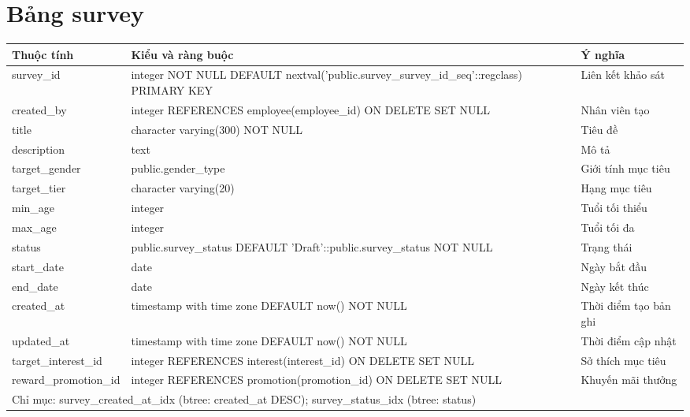 \section{Bảng survey}
\begin{longtable}{|p{}|p{}|p{}|}\hline
\textbf{Thuộc tính}&\textbf{Kiểu và ràng buộc}&\textbf{Ý nghĩa}\\\hline\endhead
survey\_id & integer NOT NULL DEFAULT nextval('public.survey\_survey\_id\_seq'::regclass) PRIMARY KEY & Liên kết khảo sát\\\hline
created\_by & integer REFERENCES employee(employee\_id) ON DELETE SET NULL & Nhân viên tạo\\\hline
title & character varying(300) NOT NULL & Tiêu đề\\\hline
description & text & Mô tả\\\hline
target\_gender & public.gender\_type & Giới tính mục tiêu\\\hline
target\_tier & character varying(20) & Hạng mục tiêu\\\hline
min\_age & integer & Tuổi tối thiểu\\\hline
max\_age & integer & Tuổi tối đa\\\hline
status & public.survey\_status DEFAULT 'Draft'::public.survey\_status NOT NULL & Trạng thái\\\hline
start\_date & date & Ngày bắt đầu\\\hline
end\_date & date & Ngày kết thúc\\\hline
created\_at & timestamp with time zone DEFAULT now() NOT NULL & Thời điểm tạo bản ghi\\\hline
updated\_at & timestamp with time zone DEFAULT now() NOT NULL & Thời điểm cập nhật\\\hline
target\_interest\_id & integer REFERENCES interest(interest\_id) ON DELETE SET NULL & Sở thích mục tiêu\\\hline
reward\_promotion\_id & integer REFERENCES promotion(promotion\_id) ON DELETE SET NULL & Khuyến mãi thưởng\\\hline
\multicolumn{3}{|p{0.93\textwidth}|}{Chỉ mục: survey\_created\_at\_idx (btree: created\_at DESC); survey\_status\_idx (btree: status)}\\\hline
\end{longtable}
\normalsize
